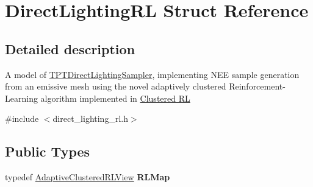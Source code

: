 \hypertarget{struct_direct_lighting_r_l}{}\section{Direct\+Lighting\+RL Struct Reference}
\label{struct_direct_lighting_r_l}


\subsection{Detailed description}
A model of \hyperlink{_p_t_lib_page_TPTDirectLightingSampler}{T\+P\+T\+Direct\+Lighting\+Sampler}, implementing N\+EE sample generation from an emissive mesh using the novel adaptively clustered Reinforcement-\/\+Learning algorithm implemented in \hyperlink{group___clustered_r_l_module}{Clustered RL} 

{\ttfamily \#include $<$direct\+\_\+lighting\+\_\+rl.\+h$>$}

\subsection*{Public Types}
\begin{DoxyCompactItemize}
\item 
\mbox{\label{struct_direct_lighting_r_l_a6b609d000811d1246b0be6c5e26bfa46}} 
typedef \hyperlink{struct_adaptive_clustered_r_l_view}{Adaptive\+Clustered\+R\+L\+View} {\bfseries R\+L\+Map}
\end{DoxyCompactItemize}
